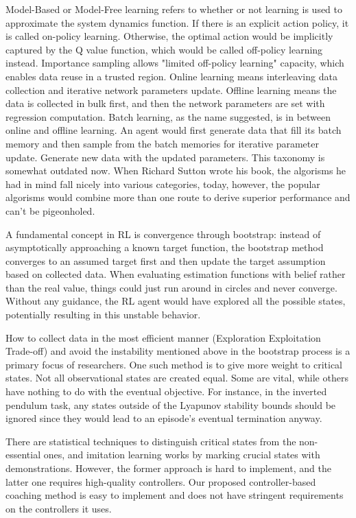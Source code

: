 \documentclass{IJCAS}
\begin{document}
Model-Based or Model-Free learning refers to whether or not learning is used to approximate the system dynamics function. If there is an explicit action policy, it is called on-policy learning. Otherwise, the optimal action would be implicitly captured by the Q value function, which would be called off-policy learning instead. Importance sampling allows "limited off-policy learning" capacity, which enables data reuse in a trusted region. Online learning means interleaving data collection and iterative network parameters update. Offline learning means the data is collected in bulk first, and then the network parameters are set with regression computation. Batch learning, as the name suggested, is in between online and offline learning. An agent would first generate data that fill its batch memory and then sample from the batch memories for iterative parameter update. Generate new data with the updated parameters. This taxonomy is somewhat outdated now. When Richard Sutton wrote his book\cite{Sutton1998IntroductionTR}, the algorisms he had in mind fall nicely into various categories, today, however, the popular algorisms would combine more than one route to derive superior performance and can't be pigeonholed.

A fundamental concept in RL is convergence through bootstrap: instead of asymptotically approaching a known target function, the bootstrap method converges to an assumed target first and then update the target assumption based on collected data. When evaluating estimation functions with belief rather than the real value, things could just run around in circles and never converge. Without any guidance, the RL agent would have explored all the possible states, potentially resulting in this unstable behavior. 

How to collect data in the most efficient manner (Exploration Exploitation Trade-off) and avoid the instability mentioned above in the bootstrap process is a primary focus of researchers. One such method is to give more weight to critical states. Not all observational states are created equal. Some are vital, while others have nothing to do with the eventual objective. For instance, in the inverted pendulum task, any states outside of the Lyapunov stability bounds should be ignored since they would lead to an episode's eventual termination anyway. 

There are statistical techniques to distinguish critical states from the non-essential ones, and imitation learning works by marking crucial states with demonstrations. However, the former approach is hard to implement, and the latter one requires high-quality controllers. Our proposed controller-based coaching method is easy to implement and does not have stringent requirements on the controllers it uses.
\end{document}
